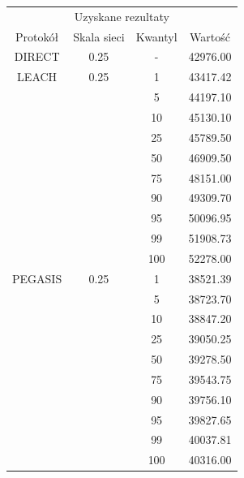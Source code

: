 \documentclass[a4paper,12pt,twoside,openany]{report}
\begin{document}
\begin{longtable}{*{4}{c}}
\toprule
\multicolumn{4}{c}{Uzyskane rezultaty} \\
Protokół	& Skala sieci	& Kwantyl	& Wartość \\
\midrule
\endhead
DIRECT	& 0.25 	& -	& 42976.00 \\*
\midrule
LEACH	& 0.25	& 1	& 43417.42 \\*
	&	& 5	& 44197.10 \\*
	&	& 10	& 45130.10 \\*
	&	& 25	& 45789.50 \\*
	&	& 50	& 46909.50 \\*
	&	& 75	& 48151.00 \\*
	&	& 90	& 49309.70 \\*
	&	& 95	& 50096.95 \\*
	&	& 99	& 51908.73 \\*
	&	& 100	& 52278.00 \\*
\midrule
PEGASIS	& 0.25	& 1	& 38521.39 \\*
	&	& 5	& 38723.70 \\*
	&	& 10	& 38847.20 \\*
	&	& 25	& 39050.25 \\*
	&	& 50	& 39278.50 \\*
	&	& 75	& 39543.75 \\*
	&	& 90	& 39756.10 \\*
	&	& 95	& 39827.65 \\*
	&	& 99	& 40037.81 \\*
	&	& 100	& 40316.00 \\*
\bottomrule
\end{longtable}
\end{document}

